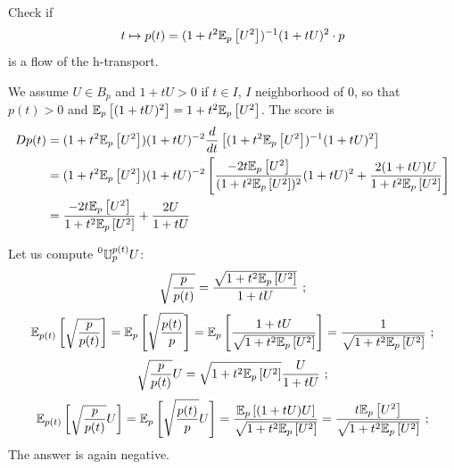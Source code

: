 \documentclass[12pt,a4paper]{amsart}
\begin{document}
  \begin{exercise}
 Check if
%
 \begin{equation*}
   t \mapsto p(t) = (1+t^2{\operatorname{\mathbb E}}_{p}\left[U^2\right])^{-1} (1+tU)^2 \cdot p
 \end{equation*}
 is a flow of the h-transport.

We assume $U \in B_p$ and $1+tU > 0$ if $t \in I$, $I$ neighborhood of 0, so that $p(t) > 0$ and ${\operatorname{\mathbb E}}_{p}\left[(1+tU)^2\right] = 1 + t^2 {\operatorname{\mathbb E}}_{p}\left[U^2\right]$. The score is
%
\begin{align*}
  Dp(t) &= (1+t^2 {\operatorname{\mathbb E}}_{p}\left[U^2\right])(1+tU)^{-2} \frac{d}{dt} \left[(1+t^2{\operatorname{\mathbb E}}_{p}\left[U^2\right])^{-1} (1+tU)^2\right] \\
&= (1+t^2 {\operatorname{\mathbb E}}_{p}\left[U^2\right])(1+tU)^{-2} \left[\frac{-2t{\operatorname{\mathbb E}}_{p}\left[U^2\right]}{(1+t^2{\operatorname{\mathbb E}}_{p}\left[U^2\right])^{2}} (1+tU)^2 + \frac{2(1+tU)U}{1+t^2{\operatorname{\mathbb E}}_{p}\left[U^2\right]}\right] \\
&= \frac{-2t{\operatorname{\mathbb E}}_{p}\left[U^2\right]}{1+t^2{\operatorname{\mathbb E}}_{p}\left[U^2\right]} + \frac{2U}{1+tU}
\end{align*}

Let us compute $\prescript{0}{}{\mathbb U}_{p}^{p(t)} U$:
%
\begin{equation*}
  \sqrt{\frac{p}{p(t)}} = \frac{\sqrt{1+t^2{\operatorname{\mathbb E}}_{p}\left[U^2\right]}}{1+tU} \ ;
\end{equation*}
%
\begin{equation*}
  {\operatorname{\mathbb E}}_{p(t)}\left[\sqrt{\frac{p}{p(t)}}\right] = {\operatorname{\mathbb E}}_{p}\left[\sqrt{\frac{p(t)}{p}}\right] = {\operatorname{\mathbb E}}_{p}\left[\frac{1+tU}{\sqrt{1+t^2{\operatorname{\mathbb E}}_{p}\left[U^2\right]}}\right] = \frac{1}{\sqrt{1+t^2{\operatorname{\mathbb E}}_{p}\left[U^2\right]}}\ ;
\end{equation*}
%
\begin{equation*}
  \sqrt{\frac{p}{p(t)}} U = \sqrt{1+t^2{\operatorname{\mathbb E}}_{p}\left[U^2\right]}\frac{U}{1+tU} \ ;
\end{equation*}
%
\begin{equation*}
  {\operatorname{\mathbb E}}_{p(t)}\left[\sqrt{\frac{p}{p(t)}}U\right] = {\operatorname{\mathbb E}}_{p}\left[\sqrt{\frac{p(t)}{p}}U\right] = \frac{{\operatorname{\mathbb E}}_{p}\left[(1+tU)U\right]}{\sqrt{1+t^2{\operatorname{\mathbb E}}_{p}\left[U^2\right]}} = \frac{t{\operatorname{\mathbb E}}_{p}\left[U^2\right]}{\sqrt{1+t^2{\operatorname{\mathbb E}}_{p}\left[U^2\right]}}\ ;
\end{equation*}
%
The answer is again negative.   
  \end{exercise}
\end{document}
